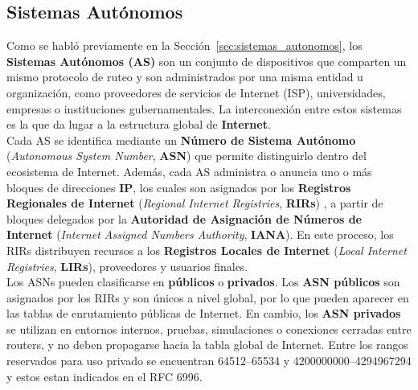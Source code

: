 
\subsection{Sistemas Autónomos} \label{sec:anexo_sistemas_autonomos}


Como se habló previamente en la Sección~\ref{sec:sistemas_autonomos}, los \textbf{Sistemas Autónomos (AS)} son un conjunto de dispositivos que comparten un mismo protocolo de ruteo y son administrados por una misma entidad u organización, como proveedores de servicios de Internet (ISP), universidades, empresas o instituciones gubernamentales. 
La interconexión entre estos sistemas es la que da lugar a la estructura global de \textbf{Internet}.\\


Cada AS se identifica mediante un \textbf{Número de Sistema Autónomo} (\textit{Autonomous System Number}, \textbf{ASN}) que permite distinguirlo dentro del ecosistema de Internet. 
Además, cada AS administra o anuncia uno o más bloques de direcciones \textbf{IP}, los cuales son asignados por los \textbf{Registros Regionales de Internet} (\textit{Regional Internet Registries}, \textbf{RIRs}) , a partir de bloques delegados por la \textbf{Autoridad de Asignación de Números de Internet} (\textit{Internet Assigned Numbers Authority}, \textbf{IANA}).
En este proceso, los RIRs distribuyen recursos a los \textbf{Registros Locales de Internet} (\textit{Local Internet Registries}, \textbf{LIRs}), proveedores y usuarios finales.\\

Los ASNs pueden clasificarse en \textbf{públicos} o \textbf{privados}. 
Los \textbf{ASN públicos} son asignados por los RIRs y son únicos a nivel global, por lo que pueden aparecer en las tablas de enrutamiento públicas de Internet. 
En cambio, los \textbf{ASN privados} se utilizan en entornos internos, pruebas, simulaciones o conexiones cerradas entre routers, y no deben propagarse hacia la tabla global de Internet. 
Entre los rangos reservados para uso privado se encuentran 64512--65534 y 4200000000--4294967294 y estos estan indicados en el RFC 6996.\\ %

